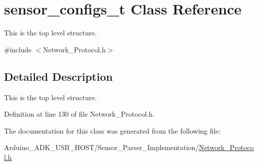 \hypertarget{classsensor__configs__t}{\section{sensor\-\_\-configs\-\_\-t Class Reference}
\label{classsensor__configs__t}
}


This is the top level structure.  




{\ttfamily \#include $<$Network\-\_\-\-Protocol.\-h$>$}



\subsection{Detailed Description}
This is the top level structure. 

Definition at line 130 of file Network\-\_\-\-Protocol.\-h.



The documentation for this class was generated from the following file\-:\begin{DoxyCompactItemize}
\item 
Arduino\-\_\-\-A\-D\-K\-\_\-\-U\-S\-B\-\_\-\-H\-O\-S\-T/\-Sensor\-\_\-\-Parser\-\_\-\-Implementation/\hyperlink{_network___protocol_8h}{Network\-\_\-\-Protocol.\-h}\end{DoxyCompactItemize}

